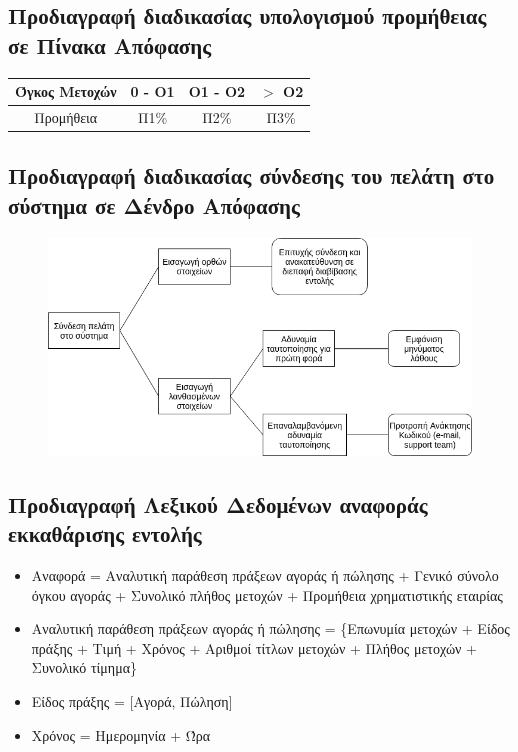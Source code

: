 \documentclass{article}
\begin{document}
\newpage
\subsection{Προδιαγραφή διαδικασίας υπολογισμού προμήθειας σε Πίνακα Απόφασης}
\begin{center}
\addtolength\tabcolsep{5pt}
\begin{tabular}{ ||c|ccc|| } 
	 \hline
	 Όγκος Μετοχών & 0 - O1 & O1 - O2 & $>$ O2 \\
	 \hline
	 Προμήθεια & Π1\% & Π2\% & Π3\%\\  
	 \hline
\end{tabular}
\end{center}

\subsection{Προδιαγραφή διαδικασίας σύνδεσης του πελάτη στο σύστημα σε Δένδρο Απόφασης}
\begin{figure}[!h]
	\includegraphics[width=\linewidth]{../Structured_Analysis/Decision_Tree.png}
\end{figure}

\subsection{Προδιαγραφή Λεξικού Δεδομένων αναφοράς εκκαθάρισης εντολής}
\begin{itemize}
\item Αναφορά = Αναλυτική παράθεση πράξεων αγοράς ή πώλησης + Γενικό σύνολο όγκου αγοράς + 
Συνολικό πλήθος μετοχών + Προμήθεια χρηματιστικής εταιρίας
\item Αναλυτική παράθεση πράξεων αγοράς ή πώλησης = \{Επωνυμία μετοχών + Είδος πράξης + Τιμή
 + Χρόνος + Αριθμοί τίτλων μετοχών + Πλήθος μετοχών + Συνολικό τίμημα\}
\item Είδος πράξης = [Αγορά, Πώληση]
\item Χρόνος = Ημερομηνία + Ώρα
\end{itemize}
\end{document}
